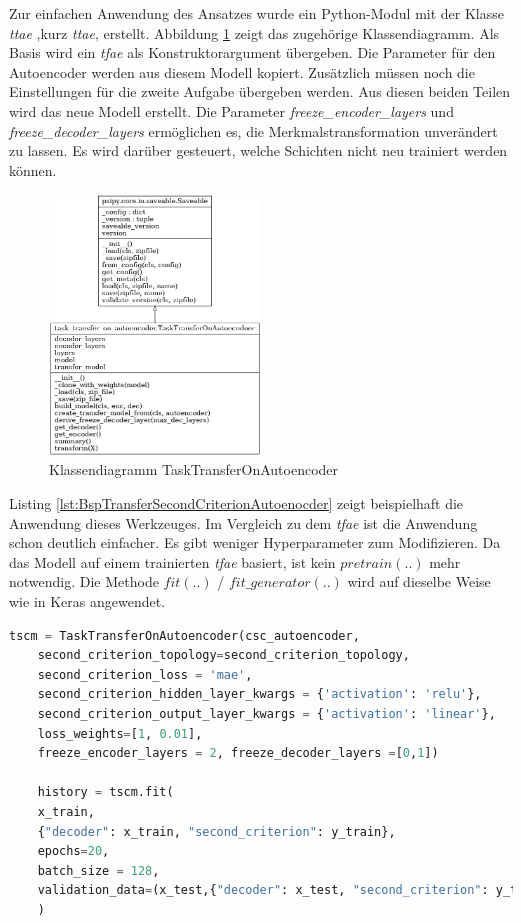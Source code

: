 	Zur einfachen Anwendung des Ansatzes wurde ein Python-Modul mit der Klasse \textit{\acl{ttae}} ,kurz \textit{\ac{ttae}}, erstellt. Abbildung \ref{img:KlassendiagrammTransferSecondCriterionAutoenocder} zeigt das zugehörige Klassendiagramm. Als Basis wird ein \textit{\ac{tfae}} als Konstruktorargument übergeben. Die Parameter für den Autoencoder werden aus diesem Modell kopiert. Zusätzlich müssen noch die Einstellungen für die zweite Aufgabe übergeben werden. Aus diesen beiden Teilen wird das neue Modell erstellt. Die Parameter \textit{freeze\_encoder\_layers} und \textit{freeze\_decoder\_layers} ermöglichen es, die Merkmalstransformation unverändert zu lassen. Es wird darüber gesteuert, welche Schichten nicht neu trainiert werden können. 
	\begin{figure}[h]
		\centering
		\includegraphics[width=0.5\textwidth, center]{bilder/Klassendiagramme/TTAE.png}
		\caption[Klassendiagramm TaskTransferOnAutoencoder]{Klassendiagramm TaskTransferOnAutoencoder}
		\label{img:KlassendiagrammTransferSecondCriterionAutoenocder}
	\end{figure}  

	Listing \ref{lst:BspTransferSecondCriterionAutoenocder} zeigt beispielhaft die Anwendung dieses Werkzeuges. Im Vergleich zu dem \textit{\ac{tfae}} ist die Anwendung schon deutlich einfacher. Es gibt weniger Hyperparameter zum Modifizieren. Da das Modell auf einem trainierten \textit{\ac{tfae}} basiert, ist kein $pretrain(..)$ mehr notwendig. Die Methode $fit(..)$ / $fit\_generator(..)$ wird auf dieselbe Weise wie in Keras angewendet.		
	\begin{lstlisting}[language=python,float = htbp,caption=Beispiel TaskTransferOnAutoencoder in Python, label=lst:BspTransferSecondCriterionAutoenocder]
	tscm = TaskTransferOnAutoencoder(csc_autoencoder,
	second_criterion_topology=second_criterion_topology,
	second_criterion_loss = 'mae',                                                                                                   
	second_criterion_hidden_layer_kwargs = {'activation': 'relu'},
	second_criterion_output_layer_kwargs = {'activation': 'linear'}, 
	loss_weights=[1, 0.01],
	freeze_encoder_layers = 2, freeze_decoder_layers =[0,1])
	
	history = tscm.fit(
	x_train,
	{"decoder": x_train, "second_criterion": y_train}, 
	epochs=20,
	batch_size = 128,
	validation_data=(x_test,{"decoder": x_test, "second_criterion": y_test}))
	)
	\end{lstlisting}	
	
